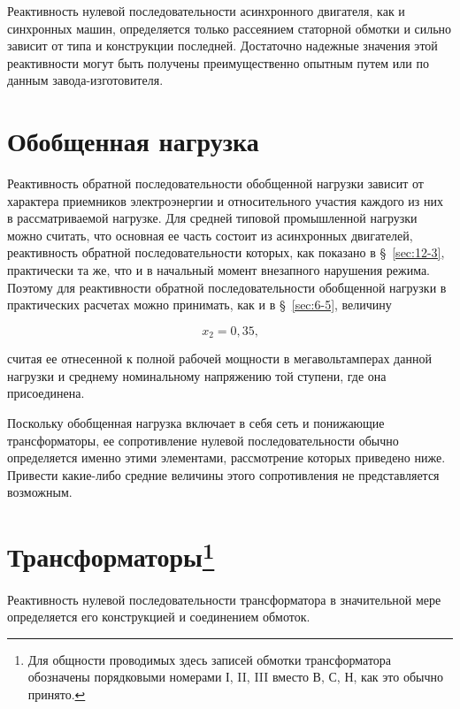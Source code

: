 Реактивность нулевой последовательности асинхронного двигателя, как и синхронных машин, определяется только рассеянием статорной обмотки и сильно зависит от типа и конструкции последней. Достаточно надежные значения этой реактивности могут быть получены преимущественно опытным путем или по данным завода-изготовителя.

\section{Обобщенная нагрузка}
\label{sec:12-4}

Реактивность обратной последовательности обобщенной нагрузки зависит от характера приемников электроэнергии и относительного участия каждого из них в рассматриваемой нагрузке. Для средней типовой промышленной нагрузки можно считать, что основная ее часть состоит из асинхронных двигателей, реактивность обратной последовательности которых, как показано в §~\ref{sec:12-3}, практически та же, что и в начальный момент внезапного нарушения режима. Поэтому для реактивности обратной последовательности обобщенной нагрузки в практических расчетах можно принимать, как и в §~\ref{sec:6-5}, величину

\begin{equation}
	x_2 = 0,35 \text{,}
	\label{eq:12-7}
\end{equation}

считая ее отнесенной к полной рабочей мощности в мегавольтамперах данной нагрузки и среднему номинальному напряжению той ступени, где она присоединена.

Поскольку обобщенная нагрузка включает в себя сеть и понижающие трансформаторы, ее сопротивление нулевой последовательности обычно определяется именно этими элементами, рассмотрение которых приведено ниже. Привести какие-либо средние величины этого сопротивления не представляется возможным.

\section{Трансформаторы\protect\footnote{Для общности проводимых здесь записей обмотки трансформатора обозначены порядковыми номерами І, II, III вместо В, С, Н, как это обычно принято.}}
\label{sec:12-5}

Реактивность нулевой последовательности трансформатора в значительной мере определяется его конструкцией и соединением обмоток.

